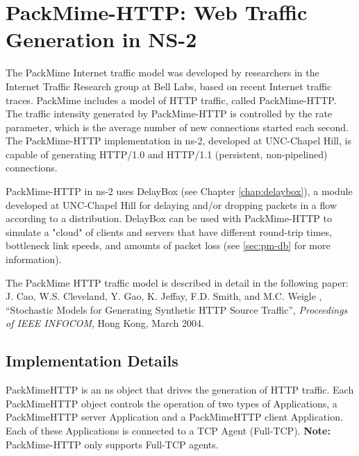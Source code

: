 \chapter{PackMime-HTTP: Web Traffic Generation in NS-2}
\label{chap:packmime}

The PackMime Internet traffic model was developed by researchers in
the Internet Traffic Research group at Bell Labs, based on recent
Internet traffic traces.  PackMime includes a model of HTTP traffic,
called PackMime-HTTP. The traffic intensity generated by PackMime-HTTP
is controlled by the rate parameter, which is the average number of
new connections started each second. The PackMime-HTTP implementation
in ns-2, developed at UNC-Chapel Hill, is capable of generating
HTTP/1.0 and HTTP/1.1 (persistent, non-pipelined) connections.

PackMime-HTTP in ns-2 uses DelayBox (see Chapter \ref{chap:delaybox}),
a module developed at UNC-Chapel Hill for delaying and/or dropping
packets in a flow according to a distribution. DelayBox can be used
with PackMime-HTTP to simulate a "cloud" of clients and servers that
have different round-trip times, bottleneck link speeds, and amounts
of packet loss (see \ref{sec:pm-db} for more information).

The PackMime HTTP traffic model is described in detail in the following paper:
J. Cao, W.S. Cleveland, Y. Gao, K. Jeffay, F.D. Smith, and M.C. Weigle
, ``Stochastic Models for Generating Synthetic HTTP Source Traffic'',
\emph{Proceedings of IEEE INFOCOM}, Hong Kong, March 2004.

\section{Implementation Details}
PackMimeHTTP is an ns object that drives the generation of HTTP
traffic. Each PackMimeHTTP object controls the operation of two types
of Applications, a PackMimeHTTP server Application and a PackMimeHTTP
client Application. Each of these Applications is connected to a TCP
Agent (Full-TCP).   {\bf Note:} PackMime-HTTP only supports Full-TCP
agents. 

